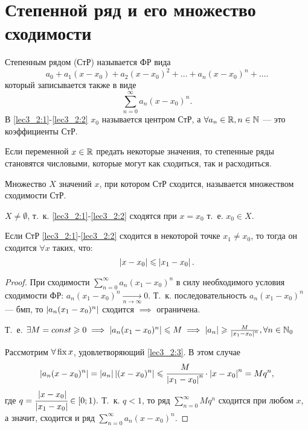 \documentclass[../../main.tex]{subfiles}
\begin{document}
\section{Степенной ряд и его множество сходимости}

Степенным рядом (СтР) называется ФР вида
\begin{equation}\label{lec3_2:1}
a_0+a_1(x-x_0)+a_2(x-x_0)^2+\dots+a_n(x-x_0)^n+\dots.
\end{equation}
который записывается также в виде
\begin{equation}\label{lec3_2:2}
\sum_{n=0}^{\infty}a_n(x-x_0)^n.
\end{equation}
В \eqref{lec3_2:1}-\eqref{lec3_2:2} $x_0$ называется центром СтР, 
а $\forall a_n \in \mathbb{R}, n\in \mathbb{N}$ --- это коэффициенты СтР.

Если переменной $x\in\mathbb{R}$ предать некоторые значения, 
то степенные ряды становятся числовыми, которые могут как сходиться, 
так и расходиться.

Множество $X$ значений $x$, при котором СтР сходится, 
называется множеством сходимости СтР. 

$X \neq \emptyset$, т.~к. \eqref{lec3_2:1}-\eqref{lec3_2:2} 
сходятся при $x=x_0$ т.~е. $x_0\in X$.

\begin{lem}
	Если СтР \eqref{lec3_2:1}-\eqref{lec3_2:2} сходится в некоторой 
	точке $x_1\neq x_0$, то тогда он сходится $\forall x$ таких, что:
	\begin{equation}\label{lec3_2:3}
		 \left|{ x - x_0}\right| \leqslant \left|{x_1 - x_0}\right|.
	\end{equation}
\end{lem}
\begin{proof}
	При сходимости $\sum_{n=0}^{\infty}a_n(x_1-x_0)^n$ в силу необходимого
	 условия сходимости ФР: $a_n(x_1-x_0)^n\underset{n\to\infty}{\rightarrow}0$. 
	Т.~к. последовательность $a_n(x_1-x_0)^n$ --- бмп, 
	то $\left|{a_n(x_1-x_0)^n}\right|$ сходится $\implies$ ограничена.
	
	Т.~е. $\exists M=const \geqslant0 \implies \left|{a_n(x_1-x_0)^n}\right| \leqslant M
	\implies \left|{a_n}\right|\geqslant \frac{M}{\left|{x_1-x_0}\right|^n}, \forall n\in\mathbb{N}_0$
	
	Рассмотрим $\forall \operatorname{fix} x $, удовлетворяющий \eqref{lec3_2:3}. 
	В этом случае  
	\begin{equation*}
		\left|{a_n(x-x_0)^n}\right| = \left|{a_n}\right|\left|{(x-x_0)^n}\right|\leqslant 
		\cfrac{M}{\left|{x_1-x_0}\right|^n}\cdot \left|{x-x_0}\right|^n=Mq^n,
	\end{equation*}
	где $q=\cfrac{\left|{x-x_0}\right|}{\left|{x_1-x_0}\right|}\in{\left[0;1\right)}.$ Т.~к. $q < 
	1$, то ряд $\sum_{n=0}^{\infty} Mq^n$ сходится при любом $x$, а значит, 
	сходится и ряд $\sum_{n=0}^{\infty} a_n(x-x_0)^n$.
\end{proof}	
\end{document}
